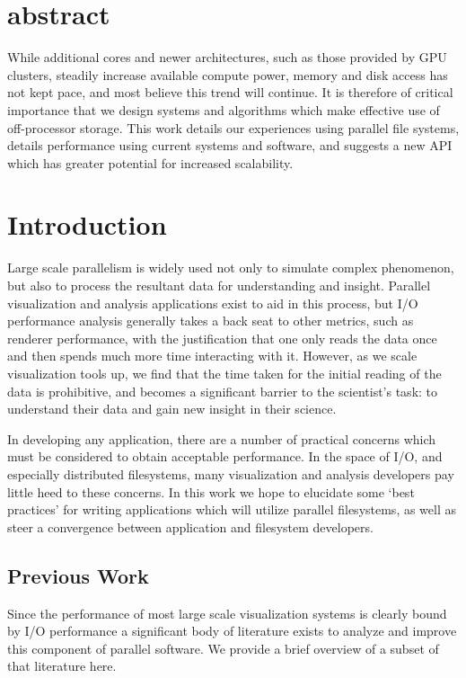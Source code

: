 \section{abstract}

While additional cores and newer architectures, such as those provided
by GPU clusters, steadily increase available compute power, memory
and disk access has not kept pace, and most believe this trend will
continue.  It is therefore of critical importance that we design
systems and algorithms which make effective use of off-processor
storage.  This work details our experiences using parallel file
systems, details performance using current systems and software,
and suggests a new API which has greater potential for increased
scalability.

\section{Introduction}

Large scale parallelism is widely used not only to simulate complex
phenomenon, but also to process the resultant data for understanding
and insight.  Parallel visualization and analysis applications exist
to aid in this process, but I/O performance analysis generally takes
a back seat to other metrics, such as renderer performance, with the
justification that one only reads the data once and then spends much
more time interacting with it.  However, as we scale visualization
tools up, we find that the time taken for the initial reading of
the data is prohibitive, and becomes a significant barrier to the
scientist's task: to understand their data and gain new insight in
their science.

In developing any application, there are a number of practical
concerns which must be considered to obtain acceptable performance.
In the space of I/O, and especially distributed filesystems, many
visualization and analysis developers pay little heed to these
concerns.  In this work we hope to elucidate some `best practices' for
writing applications which will utilize parallel filesystems, as well
as steer a convergence between application and filesystem developers.

\subsection{Previous Work}

Since the performance of most large scale visualization systems is
clearly bound by I/O performance a significant body of literature
exists to analyze and improve this component of parallel software.  We
provide a brief overview of a subset of that literature here.


